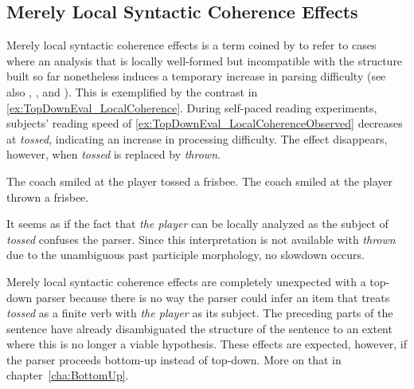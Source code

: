 \subsection{Merely Local Syntactic Coherence Effects}
\label{sub:TopDownEval_CoherenceEffects}
Merely local syntactic coherence effects is a term coined by \citet{Tabor.etal04} to refer to cases where an analysis that is locally well-formed but incompatible with the structure built so far nonetheless induces a temporary increase in parsing difficulty (see also \citealt{Konieczny05}, \citealt{Konieczny.etal09}, and \citealt{Bicknell.etal09}).
This is exemplified by the contrast in \eqref{ex:TopDownEval_LocalCoherence}.
During self-paced reading experiments, subjects' reading speed of \eqref{ex:TopDownEval_LocalCoherenceObserved} decreases at \emph{tossed}, indicating an increase in processing difficulty.
The effect disappears, however, when \emph{tossed} is replaced by \emph{thrown}.
%
\begin{exe}
    \ex\label{ex:TopDownEval_LocalCoherence}
    \begin{xlist}
        \ex The coach smiled at the player tossed a frisbee.\label{ex:TopDownEval_LocalCoherenceObserved}
        \ex The coach smiled at the player thrown a frisbee.\label{ex:TopDownEval_LocalCoherenceNotObserved}
    \end{xlist}
\end{exe}
%
It seems as if the fact that \emph{the player} can be locally analyzed as the subject of \emph{tossed} confuses the parser. 
Since this interpretation is not available with \emph{thrown} due to the unambiguous past participle morphology, no slowdown occurs.

Merely local syntactic coherence effects are completely unexpected with a top-down parser because there is no way the parser could infer an item that treats \emph{tossed} as a finite verb with \emph{the player} as its subject.
The preceding parts of the sentence have already disambiguated the structure of the sentence to an extent where this is no longer a viable hypothesis.
These effects are expected, however, if the parser proceeds bottom-up instead of top-down.
More on that in chapter~\ref{cha:BottomUp}.



